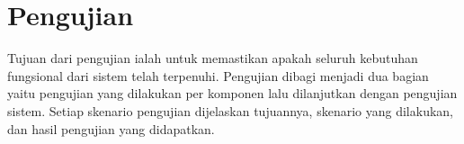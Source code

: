 \section{Pengujian}
\label{sec:pengujian}


Tujuan dari pengujian ialah untuk memastikan apakah seluruh kebutuhan fungsional dari sistem telah terpenuhi.
Pengujian dibagi menjadi dua bagian yaitu pengujian yang dilakukan per komponen lalu dilanjutkan dengan pengujian sistem. Setiap skenario pengujian dijelaskan tujuannya, skenario yang dilakukan, dan hasil pengujian yang didapatkan.








